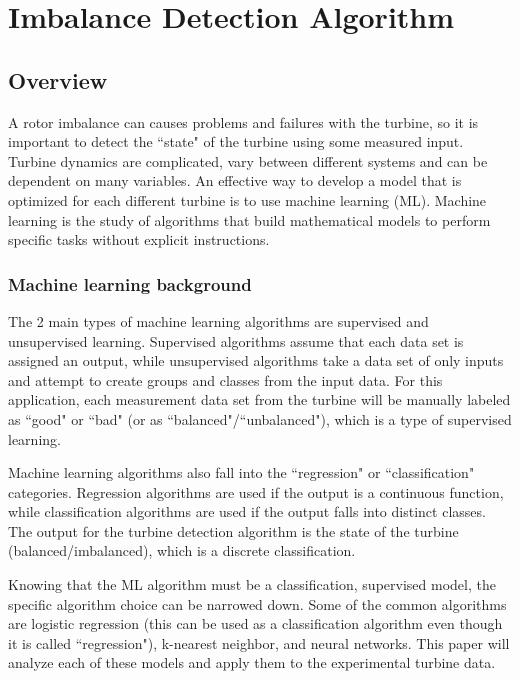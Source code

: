 \chapter{Imbalance Detection Algorithm} %
\label{ch_detection_algorithm}

\section{Overview}
A rotor imbalance can causes problems and failures with the turbine, so it is important to detect the ``state" of the turbine using some measured input.  Turbine dynamics are complicated, vary between different systems and can be dependent on many variables.  An effective way to develop a model that is optimized for each different turbine is to use machine learning (ML).  Machine learning is the study of algorithms that build mathematical models to perform specific tasks without explicit instructions.

\subsection{Machine learning background}
The 2 main types of machine learning algorithms are supervised and unsupervised learning.  Supervised algorithms assume that each data set is assigned an output, while unsupervised algorithms take a data set of only inputs and attempt to create groups and classes from the input data.  For this application, each measurement data set from the turbine will be manually labeled as ``good" or ``bad" (or as ``balanced"/``unbalanced"), which is a type of supervised learning.

Machine learning algorithms also fall into the ``regression" or ``classification" categories.  Regression algorithms are used if the output is a continuous function, while classification algorithms are used if the output falls into distinct classes.  The output for the turbine detection algorithm is the state of the turbine (balanced/imbalanced), which is a discrete classification.

Knowing that the ML algorithm must be a classification, supervised model, the specific algorithm choice can be narrowed down.  Some of the common algorithms are logistic regression (this can be used as a classification algorithm even though it is called ``regression"), k-nearest neighbor, and neural networks.  This paper will analyze each of these models and apply them to the experimental turbine data.

